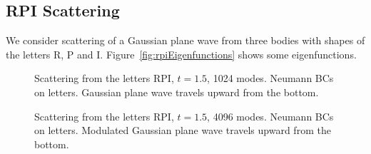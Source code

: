 \clearpage
\subsection{RPI Scattering}

We consider scattering of a Gaussian plane wave from three bodies with shapes of the letters R, P and I.
Figure~\ref{fig:rpiEigenfunctions} shows some eigenfunctions.

{
\newcommand{\width}{8cm}
\begin{figure}[htb]
\begin{center}
\end{center}
\caption{Scattering from the letters RPI, $t=1.5$, 1024 modes.
    Neumann BCs on letters. Gaussian plane wave travels upward from the bottom.}
\label{fig:rpiScatteringNeumann}
\end{figure}
}

{
\newcommand{\width}{8cm}
\begin{figure}[htb]
\begin{center}
\end{center}
\caption{Scattering from the letters RPI, $t=1.5$, 4096 modes.
    Neumann BCs on letters. Modulated Gaussian plane wave travels upward from the bottom.}
\label{fig:rpiScattering4096Neumann}
\end{figure}
}



